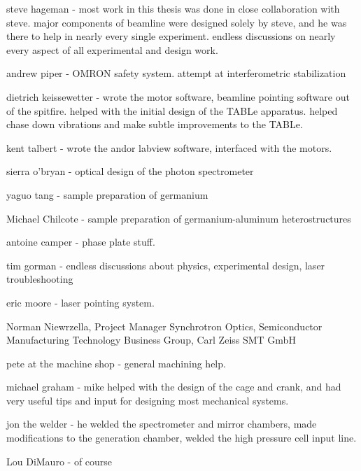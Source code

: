 \begin{acknowledgments}

steve hageman - most work in this thesis was done in close collaboration with steve. major components of beamline were designed solely by steve, and he was there to help in nearly every single experiment. endless discussions on nearly every aspect of all experimental and design work.

andrew piper - OMRON safety system. attempt at interferometric stabilization

dietrich keissewetter - wrote the motor software, beamline pointing software out of the spitfire. helped with the initial design of the TABLe apparatus. helped chase down vibrations and make subtle improvements to the TABLe.

kent talbert - wrote the andor labview software, interfaced with the motors.

sierra o'bryan - optical design of the photon spectrometer

yaguo tang - sample preparation of germanium

Michael Chilcote - sample preparation of germanium-aluminum heterostructures

antoine camper - phase plate stuff.

tim gorman - endless discussions about physics, experimental design, laser 
troubleshooting

eric moore - laser pointing system.

Norman Niewrzella, Project Manager Synchrotron Optics, Semiconductor Manufacturing Technology Business Group, Carl Zeiss SMT GmbH

pete at the machine shop - general machining help.

michael graham - mike helped with the design of the cage and crank, and had very useful tips and input for designing most mechanical systems.

jon the welder - he welded the spectrometer and mirror chambers, made modifications to the generation chamber, welded the high pressure cell input line.

Lou DiMauro - of course

\end{acknowledgments}